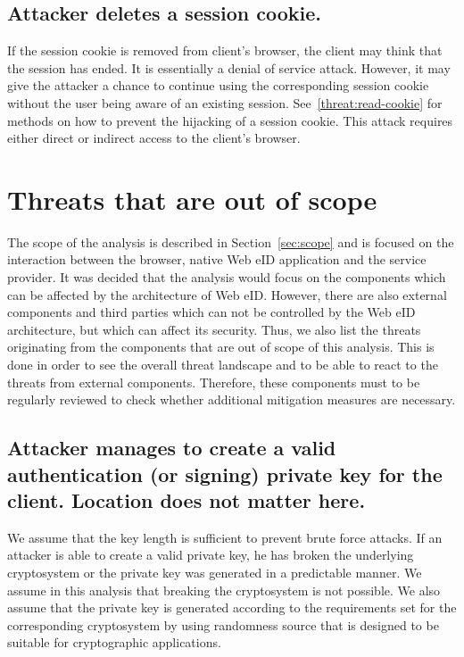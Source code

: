 \subsection{Attacker deletes a session cookie.}
\label{threat:delete-cookie}
If the session cookie is removed from client's browser, the client may think that the session has ended. It is essentially a denial of service attack. However, it may give the attacker a chance to continue using the corresponding session cookie without the user being aware of an existing session. See~\ref{threat:read-cookie} for methods on how to prevent the hijacking of a session cookie. This attack requires either direct or indirect access to the client's browser. 









\newpage
\section{Threats that are out of scope}
\label{sec:out_of_scope_threats}
The scope of the analysis is described in Section~\ref{sec:scope} and is focused on the interaction between the browser, native Web eID application and the service provider. It was decided that the analysis would focus on the components which can be affected by the architecture of Web eID. However, there are also external components and third parties which can not be controlled by the Web eID architecture, but which can affect its security. Thus, we also list the threats originating from the components that are out of scope of this analysis. This is done in order to see the overall threat landscape and to be able to react to the threats from external components. Therefore, these components must to be regularly reviewed to check whether additional mitigation measures are necessary. 

\subsection{Attacker manages to create a valid authentication (or signing) private key for the client. Location does not matter here.}\label{threat:create-private-key}
We assume that the key length is sufficient to prevent brute force attacks. If an attacker is able to create a valid private key, he has broken the underlying cryptosystem or the private key was generated in a predictable manner. We assume in this analysis that breaking the cryptosystem is not possible. We also assume that the private key is generated according to the requirements set for the corresponding cryptosystem by using randomness source that is designed to be suitable for cryptographic applications. 


